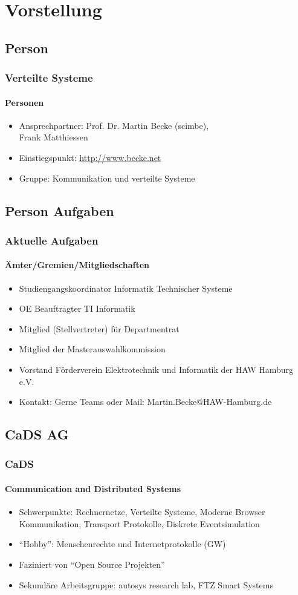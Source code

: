 \section{Vorstellung}
\subsection{Person}
\begin{frame}
  \frametitle{Verteilte Systeme}
  \framesubtitle{Personen}
  \begin{itemize}
    \item Ansprechpartner: Prof. Dr. Martin Becke (scimbe),\\ Frank Matthiessen
    \item Einstiegspunkt: \url{http://www.becke.net}
    \item Gruppe: Kommunikation und verteilte Systeme
  \end{itemize}
\end{frame}


\subsection{Person Aufgaben}
\begin{frame}
  \frametitle{Aktuelle Aufgaben}
  \framesubtitle{Ämter/Gremien/Mitgliedschaften }
  \begin{itemize}
    \item Studiengangskoordinator Informatik Technischer Systeme
    \item OE Beauftragter TI Informatik 
    \item Mitglied (Stellvertreter) für Departmentrat 
    \item Mitglied der Masterauswahlkommission
    \item Vorstand Förderverein Elektrotechnik und Informatik der HAW Hamburg e.V.
    \item Kontakt: Gerne Teams oder Mail: Martin.Becke@HAW-Hamburg.de
  \end{itemize}
\end{frame}

\subsection{CaDS AG}
\begin{frame}
  \frametitle{CaDS}
  \framesubtitle{Communication and Distributed Systems }
  \begin{itemize}
    \item Schwerpunkte: Rechnernetze, Verteilte Systeme, Moderne Browser Kommunikation, Transport Protokolle, Diskrete Eventsimulation 
    \item \enquote{Hobby}: Menschenrechte und Internetprotokolle (GW)
    \item Faziniert von \enquote{Open Source Projekten}
    \item Sekundäre Arbeitsgruppe: autosys research lab, FTZ Smart Systems
  \end{itemize}
\end{frame}


